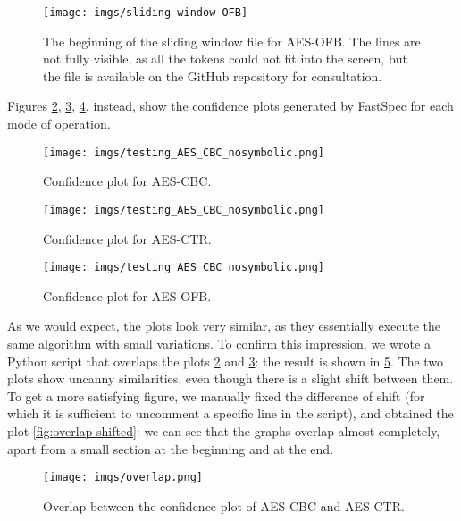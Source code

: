 \documentclass[target=mst,aauheader=aics]{thud}
\theoremstyle{definition}
\begin{document}
	\begin{figure}
		\centering
		\texttt{[image: imgs/sliding-window-OFB]}
		\caption{The beginning of the sliding window file for AES-OFB. The lines are not fully visible, as all the tokens could not fit into the screen, but the file is available on the GitHub repository for consultation.}
		\label{fig:sliding-wnd}
	\end{figure}

	Figures \ref{fig:conf-cbc}, \ref{fig:conf-ctr}, \ref{fig:conf-ofb}, instead, show the confidence plots generated by FastSpec for each mode of operation. 

	\begin{figure}[h]
		\centering
		\texttt{[image: imgs/testing\_AES\_CBC\_nosymbolic.png]}
		\caption{Confidence plot for AES-CBC.}
		\label{fig:conf-cbc}
	\end{figure}
	\begin{figure}[!h]
		\centering
		\texttt{[image: imgs/testing\_AES\_CBC\_nosymbolic.png]}
		\caption{Confidence plot for AES-CTR.}
		\label{fig:conf-ctr}		
	\end{figure}
	\begin{figure}[!h]
		\centering
		\texttt{[image: imgs/testing\_AES\_CBC\_nosymbolic.png]}
		\caption{Confidence plot for AES-OFB.}
		\label{fig:conf-ofb}
	\end{figure}

	As we would expect, the plots look very similar, as they essentially execute the same algorithm with small variations.
	To confirm this impression, we wrote a Python script that overlaps the plots \ref{fig:conf-cbc} and \ref{fig:conf-ctr}: the result is shown in \ref{fig:overlap}. The two plots show uncanny similarities, even though there is a slight shift between them. To get a more satisfying figure, we manually fixed the difference of shift (for which it is sufficient to uncomment a specific line in the script), and obtained the plot \ref{fig:overlap-shifted}: we can see that the graphs overlap almost completely, apart from a small section at the beginning and at the end.
	
	\begin{figure}
		\hspace*{-0.7cm}
		\texttt{[image: imgs/overlap.png]}
		\caption{Overlap between the confidence plot of AES-CBC and AES-CTR.}
		\label{fig:overlap}
	\end{figure}
	
\end{document}
